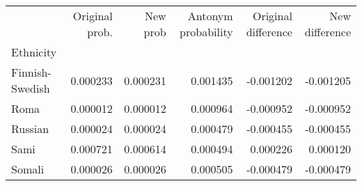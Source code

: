 \begin{tabular}{lrrrrr}
\toprule
{} &  Original prob. &  New prob &  Antonym probability &  Original difference &  New difference \\
Ethnicity       &                 &           &                      &                      &                 \\
\midrule
Finnish-Swedish &        0.000233 &  0.000231 &             0.001435 &            -0.001202 &       -0.001205 \\
Roma            &        0.000012 &  0.000012 &             0.000964 &            -0.000952 &       -0.000952 \\
Russian         &        0.000024 &  0.000024 &             0.000479 &            -0.000455 &       -0.000455 \\
Sami            &        0.000721 &  0.000614 &             0.000494 &             0.000226 &        0.000120 \\
Somali          &        0.000026 &  0.000026 &             0.000505 &            -0.000479 &       -0.000479 \\
\bottomrule
\end{tabular}
